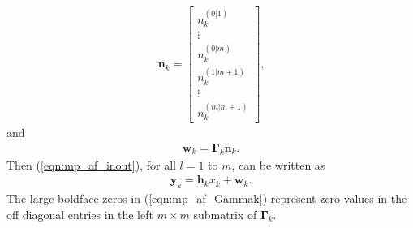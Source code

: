 \documentclass[journal]{IEEEtran}
\begin{document}
\begin{eqnarray}
\mathbf{n}_k = \left[
\begin{array}{c}
n_k^{(0|1)} \\ \vdots  \\ n_k^{(0|m)} \\  n_k^{(1|m+1)} \\  \vdots  \\ n_k^{(m|m+1)}
\end{array}  \right] \mbox{,}
\label{eqn:mp_af_nk}
\end{eqnarray}
and
\begin{eqnarray}
\mathbf{w}_k = \mathbf{\Gamma}_k \mathbf{n}_k \mbox{.}
\label{eqn:mp_af_wk}
\end{eqnarray}
Then (\ref{eqn:mp_af_inout}), for all $l = 1$ to $m$, can be
written as
\begin{eqnarray}
\mathbf{y}_k = \mathbf{h}_k x_k + \mathbf{w}_k \mbox{.}
\label{eqn:mp_af_inout_terse}
\end{eqnarray}
The large boldface zeros in (\ref{eqn:mp_af_Gammak}) represent
zero values in the off diagonal entries in the left $m \times m$
submatrix of $\mathbf{\Gamma}_k$.
\end{document}
